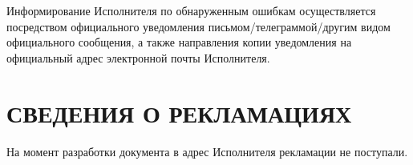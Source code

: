 \documentclass[russian, utf8, 12pt,pointsubsection,floatsubsection]{eskdtext}
\begin{document}
Информирование Исполнителя по обнаруженным ошибкам осуществляется посредством
официального уведомления письмом/телеграммой/другим видом официального сообщения, а
также направления копии уведомления на официальный адрес электронной почты Исполнителя.

\section{СВЕДЕНИЯ О РЕКЛАМАЦИЯХ}
На момент разработки документа в адрес Исполнителя рекламации не поступали.
\end{document}
